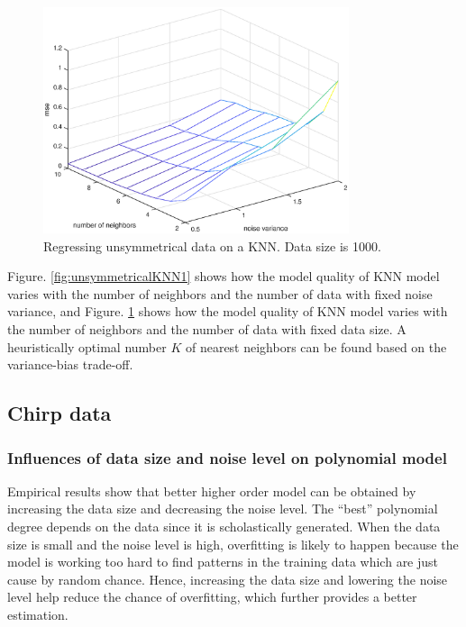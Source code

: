 \documentclass[]{article}
\begin{document}
\begin{figure}[H]
	\caption{Regressing unsymmetrical data on a KNN. Data size is 1000.}
	\label{fig:unsymmetricalKNN2}
	\centering
	\includegraphics[width=0.8\textwidth]{project32d2}
\end{figure}

Figure. \ref{fig:unsymmetricalKNN1} shows how the model quality of KNN model varies with the number of neighbors and the number of data with fixed noise variance, and Figure. \ref{fig:unsymmetricalKNN2} shows how the model quality of KNN model varies with the number of neighbors and the number of data with fixed data size. A heuristically optimal number $K$ of nearest neighbors can be found based on the variance-bias trade-off.

\subsection{Chirp data}

\subsubsection{Influences of data size and noise level on polynomial model}

Empirical results show that better higher order model can be obtained by increasing the data size and decreasing the noise level. The ``best'' polynomial degree depends on the data since it is scholastically generated. When the data size is small and the noise level is high, overfitting is likely to happen because the model is working too hard to find patterns in the training data which are just cause by random chance. Hence, increasing the data size and lowering the noise level help reduce the chance of overfitting, which further provides a better estimation.
\end{document}
